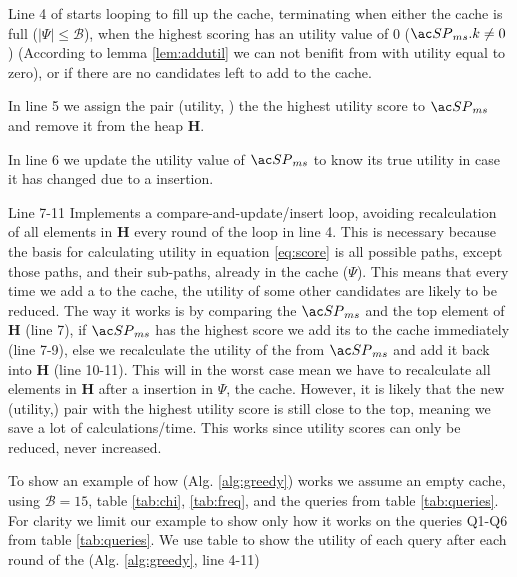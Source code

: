 Line 4 of \salgo starts looping to fill up the cache, terminating when either the cache is full ($| \Psi | \leq  \mathcal{B}$), when the highest scoring \spath has an utility value of 0 ($\spath_{ms}.k \neq 0$) (According to lemma \ref{lem:addutil} we can not benifit from \spaths with utility equal to zero), or if there are no \spath candidates left to add to the cache.

In line 5 we assign the pair (utility, \spath) the the highest utility score to $\spath_{ms}$ and remove it from the heap \textbf{H}.

In line 6 we update the utility value of $\spath_{ms}$ to know its true utility in case it has changed due to a \spath insertion.

Line 7-11 Implements a compare-and-update/insert loop, avoiding recalculation of all elements in \textbf{H} every round of the loop in line 4. This is necessary because the basis for calculating utility in equation \ref{eq:score} is all possible paths, except those paths, and their sub-paths, already in the cache ($\Psi$). This means that every time we add a \spath to the cache, the utility of some other candidates are likely to be reduced. The way it works is by comparing the $\spath_{ms}$ and the top element of \textbf{H} (line 7), if $\spath_{ms}$ has the highest score we add its \spath to the cache immediately (line 7-9), else we recalculate the utility of the \spath from $\spath_{ms}$ and add it back into \textbf{H} (line 10-11). This will in the worst case mean we have to recalculate all elements in \textbf{H} after a \spath insertion in $\Psi$, the cache. However, it is likely that the new (utility,\spath) pair with the highest utility score is still close to the top, meaning we save a lot of calculations/time. This works since utility scores can only be reduced, never increased.



To show an example of how \salgo (Alg. \ref{alg:greedy}) works we assume an empty cache, using $\mathcal{B}=15$, table \ref{tab:chi}, \ref{tab:freq}, and the queries from table \ref{tab:queries}. For clarity we limit our example to show only how it works on the queries Q1-Q6 from table \ref{tab:queries}. We use table \label{tab:steputil} to show the utility of each query after each round of the \salgo (Alg. \ref{alg:greedy}, line 4-11)

